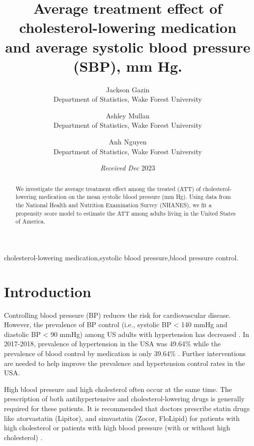 \documentclass[useAMS,usenatbib,referee]{biom}
\title[]{Average treatment effect of cholesterol-lowering medication and
average systolic blood pressure (SBP), mm Hg.}
\author{ Jackson
Gazin \email{\href{mailto:gazij22@wfu.edu}{\nolinkurl{gazij22@wfu.edu}}} \\ Department
of Statistics, Wake Forest University  \and
		 Ashley
Mullan \email{\href{mailto:mullae22@wfu.edu}{\nolinkurl{mullae22@wfu.edu}}} \\ Department
of Statistics, Wake Forest University  \and
		 Anh
Nguyen \email{\href{mailto:nguyp22@wfu.edu}{\nolinkurl{nguyp22@wfu.edu}}} \\ Department
of Statistics, Wake Forest University 
	   }
\begin{document}
\date{{\it Received Dec} 2023}

\pagerange{\pageref{firstpage}--\pageref{lastpage}} 



\label{firstpage}


\begin{abstract}
We investigate the average treatment effect among the treated (ATT) of
cholesterol-lowering medication on the mean systolic blood pressure (mm
Hg). Using data from the National Health and Nutrition Examination
Survey (NHANES), we fit a propensity score model to estimate the ATT
among adults living in the United States of America.
\end{abstract}

%
%

\begin{keywords}
cholesterol-lowering medication,systolic blood pressure,blood pressure
control.
\end{keywords}

\maketitle

\hypertarget{intro}{%
\section{Introduction}\label{intro}}

Controlling blood pressure (BP) reduces the risk for cardiovascular
disease. However, the prevalence of BP control (i.e., systolic BP
\textless{} 140 mmHg and diastolic BP \textless{} 90 mmHg) among US
adults with hypertension has decreased \citep{cdc_prevalence_nodate}. In
2017-2018, prevalence of hypertension in the USA was 49.64\% while the
prevalence of blood control by medication is only 39.64\%
\citep{chobufo_prevalence_2020}. Further interventions are needed to
help improve the prevalence and hypertension control rates in the USA.

High blood pressure and high cholesterol often occur at the same time.
The prescription of both antihypertensive and cholesterol-lowering drugs
is generally required for these patients. It is recommended that doctors
prescribe statin drugs like atorvastatin (Lipitor), and simvastatin
(Zocor, FloLipid) for patients with high cholesterol or patients with
high blood pressure (with or without high cholesterol)
\citep{williams_facing_2020}. \citep{egan_blood_2013}
\end{document}
